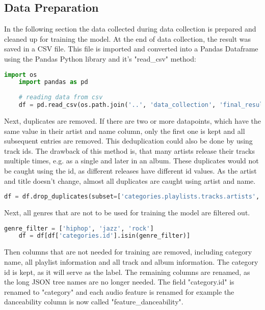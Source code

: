 \subsection{Data Preparation}

In the following section the data collected during data collection is prepared and cleaned up for training 
the model. At the end of data collection, the result was saved in a CSV file. This file is imported and converted
into a Pandas Dataframe using the Pandas Python library and it's "read\_csv" method:

\begin{lstlisting}[language=Python]
    import os
    import pandas as pd
    
    # reading data from csv
    df = pd.read_csv(os.path.join('..', 'data_collection', 'final_result.csv'))
\end{lstlisting}

Next, duplicates are removed. If there are two or more datapoints, which have the same value in their artist
and name column, only the first one is kept and all subsequent entries are removed.
This deduplication could also be done by using track ids. The drawback of this method is, that many artists
release their tracks multiple times, e.g. as a single and later in an album. These duplicates would not be
caught using the id, as different releases have different id values. As the artist and title doesn't change, almost
all duplicates are caught using artist and name.

\begin{lstlisting}[language=Python]
    df = df.drop_duplicates(subset=['categories.playlists.tracks.artists', 'categories.playlists.tracks.name'])
\end{lstlisting}

Next, all genres that are not to be used for training the model are filtered out.

\begin{lstlisting}[language=Python]
    genre_filter = ['hiphop', 'jazz', 'rock']
    df = df[df['categories.id'].isin(genre_filter)]
\end{lstlisting}

Then columns that are not needed for training are removed, including category name, all playlist information and
all track and album information. The category id is kept, as it will serve as the label.
The remaining columns are renamed, as the long JSON tree names are no longer needed.
The field "category.id" is renamed to "category" and each audio feature is renamed for example 
the danceability column is now called "feature\_danceability".

